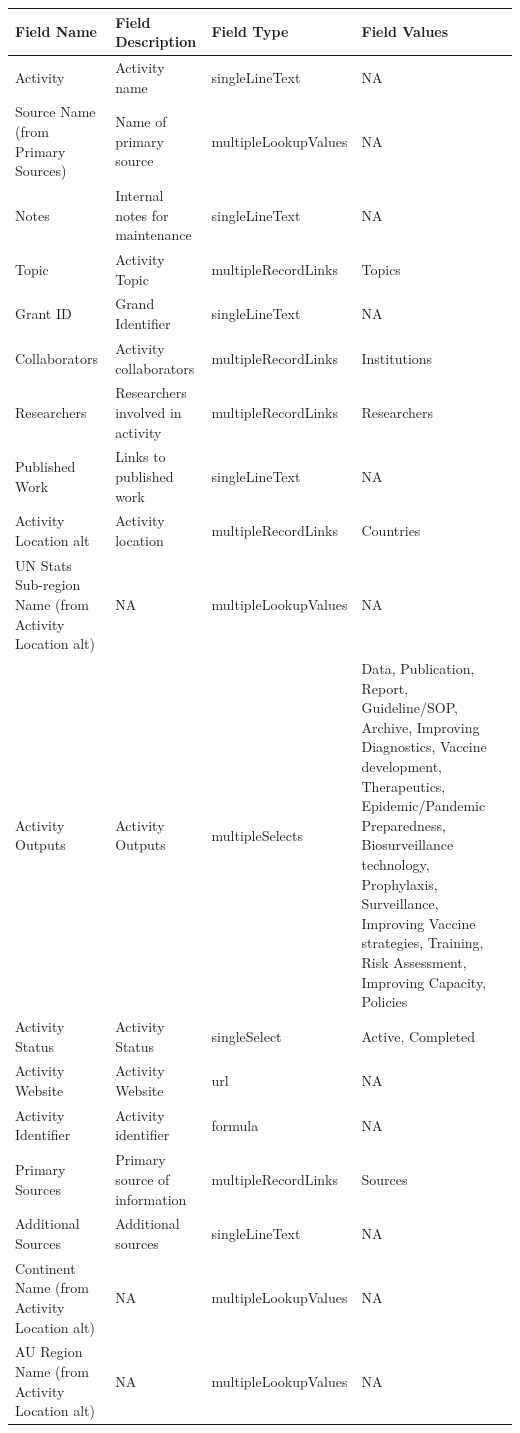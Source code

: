 \documentclass[
]{book}
\begin{document}
\begin{table}
\centering
\begin{tabular}{l|l|l|l}
\hline
\textbf{Field Name} & \textbf{Field Description} & \textbf{Field Type} & \textbf{Field Values}\\
\hline
Activity & Activity name & singleLineText & NA\\
\hline
Source Name (from Primary Sources) & Name of primary source & multipleLookupValues & NA\\
\hline
Notes & Internal notes for maintenance & singleLineText & NA\\
\hline
Topic & Activity Topic & multipleRecordLinks & Topics\\
\hline
Grant ID & Grand Identifier & singleLineText & NA\\
\hline
Collaborators & Activity collaborators & multipleRecordLinks & Institutions\\
\hline
Researchers & Researchers involved in activity & multipleRecordLinks & Researchers\\
\hline
Published Work & Links to published work & singleLineText & NA\\
\hline
Activity Location alt & Activity location & multipleRecordLinks & Countries\\
\hline
UN Stats Sub-region Name (from Activity Location alt) & NA & multipleLookupValues & NA\\
\hline
Activity Outputs & Activity Outputs & multipleSelects & Data, Publication, Report, Guideline/SOP, Archive, Improving Diagnostics, Vaccine development, Therapeutics, Epidemic/Pandemic Preparedness, Biosurveillance technology, Prophylaxis, Surveillance, Improving Vaccine strategies, Training, Risk Assessment, Improving Capacity, Policies\\
\hline
Activity Status & Activity Status & singleSelect & Active, Completed\\
\hline
Activity Website & Activity Website & url & NA\\
\hline
Activity Identifier & Activity identifier & formula & NA\\
\hline
Primary Sources & Primary source of information & multipleRecordLinks & Sources\\
\hline
Additional Sources & Additional sources & singleLineText & NA\\
\hline
Continent Name (from Activity Location alt) & NA & multipleLookupValues & NA\\
\hline
AU Region Name (from Activity Location alt) & NA & multipleLookupValues & NA\\
\hline
\end{tabular}
\end{table}
\end{document}
